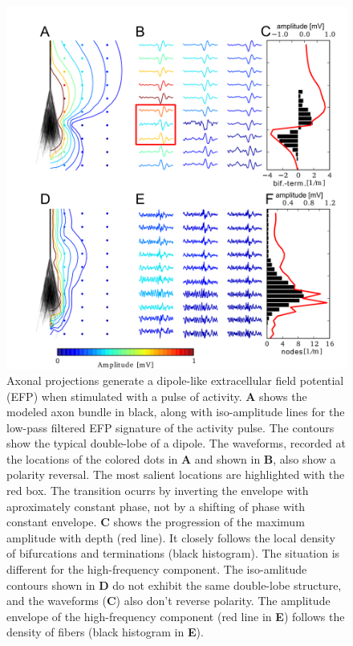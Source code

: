 \documentclass[]{article}
\begin{document}
\begin{figure}[htbp]
\centering
\includegraphics{../figs/fig_1.pdf}
\caption{Axonal projections generate a dipole-like extracellular field
potential (EFP) when stimulated with a pulse of activity. \textbf{A}
shows the modeled axon bundle in black, along with iso-amplitude lines
for the low-pass filtered EFP signature of the activity pulse. The
contours show the typical double-lobe of a dipole. The waveforms,
recorded at the locations of the colored dots in \textbf{A} and shown in
\textbf{B}, also show a polarity reversal. The most salient locations
are highlighted with the red box. The transition ocurrs by inverting the
envelope with aproximately constant phase, not by a shifting of phase
with constant envelope. \textbf{C} shows the progression of the maximum
amplitude with depth (red line). It closely follows the local density of
bifurcations and terminations (black histogram). The situation is
different for the high-frequency component. The iso-amlitude contours
shown in \textbf{D} do not exhibit the same double-lobe structure, and
the waveforms (\textbf{C}) also don't reverse polarity. The amplitude
envelope of the high-frequency component (red line in \textbf{E})
follows the density of fibers (black histogram in \textbf{E}).}
\end{figure}
\end{document}
